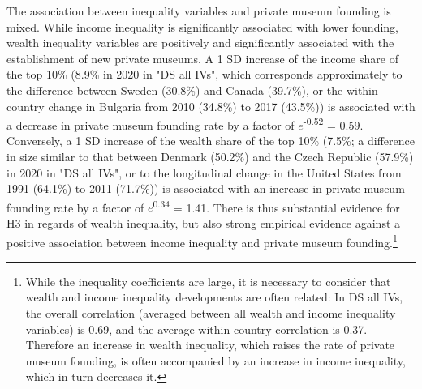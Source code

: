 \documentclass[11pt]{article}
\begin{document}
The association between inequality variables and private museum founding is mixed.
While income inequality is significantly associated with lower founding, wealth inequality variables are positively and significantly associated with the establishment of new private museums. 
A 1 SD increase of the income share of the top 10\% (8.9\% in 2020 in "DS all IVs", which corresponds approximately to the difference between Sweden (30.8\%) and Canada (39.7\%), or the within-country change in Bulgaria from 2010 (34.8\%) to 2017 (43.5\%)) is associated with a decrease in private museum founding rate by a factor of \(e\)\textsuperscript{-0.52} = 0.59. 
Conversely, a 1 SD increase of the wealth share of the top 10\% (7.5\%; a difference in size similar to that between Denmark (50.2\%) and the Czech Republic (57.9\%) in 2020 in "DS all IVs", or to the longitudinal change in the United States from 1991 (64.1\%) to 2011 (71.7\%)) is associated with an increase in private museum founding rate by a factor of \(e\)\textsuperscript{0.34} = 1.41.
There is thus substantial evidence for H3 in regards of wealth inequality, but also strong empirical evidence against a positive association between income inequality and private museum founding.\footnote{While the inequality coefficients are large, it is necessary to consider that wealth and income inequality developments are often related:
In DS all IVs, the overall correlation (averaged between all wealth and income inequality variables) is 0.69, and the average within-country correlation is 0.37.
Therefore an increase in wealth inequality, which raises the rate of private museum founding, is often accompanied by an increase in income inequality, which in turn decreases it.}
\end{document}
